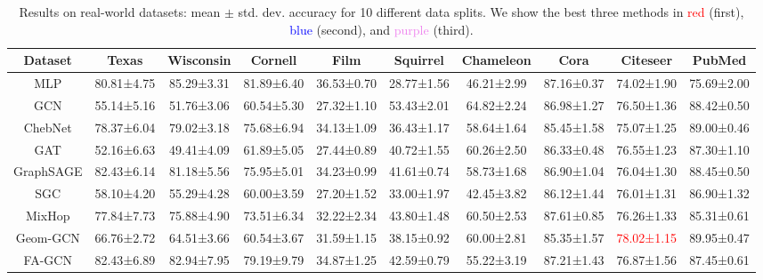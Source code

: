 \documentclass{article}
\theoremstyle{plain}
\theoremstyle{definition}
\theoremstyle{remark}
\newcommand{\std}{\scriptsize{}}
\newcommand{\BEST}[1]{\textcolor{red}{#1}}
\newcommand{\SECOND}[1]{\textcolor{blue}{#1}}
\newcommand{\THIRD}[1]{\textcolor{violet}{#1}}
\begin{document}
\begin{table}[ht]
    \small
    \centering
    \setlength{\tabcolsep}{2pt}
    \caption{Results on real-world datasets: mean $\pm$ std. dev. accuracy for 10 different data splits. We show the best three methods in \BEST{red} (first), \SECOND{blue} (second), and \THIRD{purple} (third).}
\begin{tabular}{c ccccccccc}\toprule
        Dataset     & Texas      & Wisconsin  & Cornell    & Film       & Squirrel   & Chameleon  & Cora       & Citeseer   & PubMed\\ \midrule
        MLP	        & 80.81\std{±4.75} & 85.29\std{±3.31} & 81.89\std{±6.40} & 36.53\std{±0.70} & 28.77\std{±1.56} & 46.21\std{±2.99} & 87.16\std{±0.37} & 74.02\std{±1.90} & 75.69\std{±2.00}\\
        \midrule
        GCN	        & 55.14\std{±5.16} & 51.76\std{±3.06} & 60.54\std{±5.30} & 27.32\std{±1.10} & 53.43\std{±2.01} & 64.82\std{±2.24} & 86.98\std{±1.27} & 76.50\std{±1.36} & 88.42\std{±0.50}\\
        ChebNet     & 78.37\std{±6.04} & 79.02\std{±3.18} & 75.68\std{±6.94} & 34.13\std{±1.09}	& 36.43\std{±1.17} & 58.64\std{±1.64} & 85.45\std{±1.58} & 75.07\std{±1.25}	& 89.00\std{±0.46}\\
        GAT	        & 52.16\std{±6.63} & 49.41\std{±4.09} & 61.89\std{±5.05} & 27.44\std{±0.89} & 40.72\std{±1.55} & 60.26\std{±2.50} & 86.33\std{±0.48} & 76.55\std{±1.23} & 87.30\std{±1.10}\\
        GraphSAGE	& 82.43\std{±6.14} & 81.18\std{±5.56} & 75.95\std{±5.01} & 34.23\std{±0.99} & 41.61\std{±0.74} & 58.73\std{±1.68} & 86.90\std{±1.04} & 76.04\std{±1.30} & 88.45\std{±0.50}\\
        SGC         & 58.10\std{±4.20} & 55.29\std{±4.28} & 60.00\std{±3.59} & 27.20\std{±1.52} & 33.00\std{±1.97} & 42.45\std{±3.82} & 86.12\std{±1.44} & 76.01\std{±1.31} & 86.90\std{±1.32}\\
        \midrule
        MixHop      & 77.84\std{±7.73} & 75.88\std{±4.90} & 73.51\std{±6.34} & 32.22\std{±2.34} & 43.80\std{±1.48} & 60.50\std{±2.53} & 87.61\std{±0.85} & 76.26\std{±1.33}	& 85.31\std{±0.61}\\
        Geom-GCN	& 66.76\std{±2.72} & 64.51\std{±3.66} & 60.54\std{±3.67} & 31.59\std{±1.15} & 38.15\std{±0.92} & 60.00\std{±2.81} & 85.35\std{±1.57} & \BEST{78.02\std{±1.15}} & 89.95\std{±0.47}\\
        FA-GCN      & 82.43\std{±6.89} & 82.94\std{±7.95} & 79.19\std{±9.79} & 34.87\std{±1.25} & 42.59\std{±0.79} & 55.22\std{±3.19} & 87.21\std{±1.43} & 76.87\std{±1.56}	& 87.45\std{±0.61}\\

\end{tabular}
\end{table}
\end{document}
